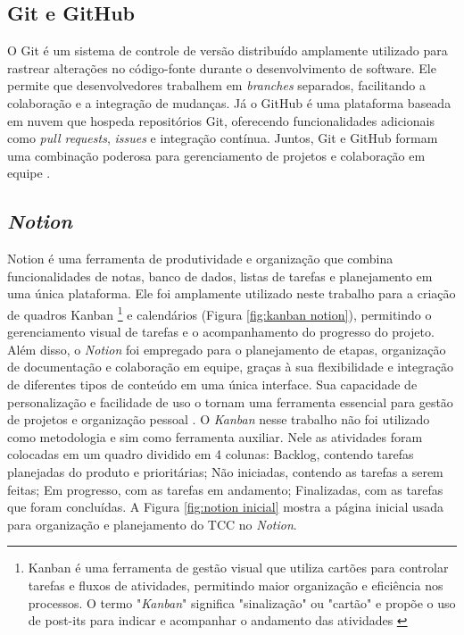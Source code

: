 {\subsection{Git e GitHub}
O Git é um sistema de controle de versão distribuído amplamente utilizado para rastrear alterações no código-fonte durante o desenvolvimento de software. Ele permite que desenvolvedores trabalhem em \textit{branches} separados, facilitando a colaboração e a integração de mudanças. Já o GitHub é uma plataforma baseada em nuvem que hospeda repositórios Git, oferecendo funcionalidades adicionais como \textit{pull requests}, \textit{issues} e integração contínua. Juntos, Git e GitHub formam uma combinação poderosa para gerenciamento de projetos e colaboração em equipe \citep{git,github}.

\subsection{\textit{Notion}}
 Notion é uma ferramenta de produtividade e organização que combina funcionalidades de notas, banco de dados, listas de tarefas e planejamento em uma única plataforma. Ele foi amplamente utilizado neste trabalho para a criação de quadros Kanban \footnote{Kanban é uma ferramenta de gestão visual que utiliza cartões para controlar tarefas e fluxos de atividades, permitindo maior organização e eficiência nos processos. O termo "\textit{Kanban}" significa "sinalização" ou "cartão" e propõe o uso de post-its para indicar e acompanhar o andamento das atividades \citep{aguiar2007compreendendo}} e calendários (Figura \ref{fig:kanban notion}), permitindo o gerenciamento visual de tarefas e o acompanhamento do progresso do projeto. Além disso, o \textit{Notion} foi empregado para o planejamento de etapas, organização de documentação e colaboração em equipe, graças à sua flexibilidade e integração de diferentes tipos de conteúdo em uma única interface. Sua capacidade de personalização e facilidade de uso o tornam uma ferramenta essencial para gestão de projetos e organização pessoal \citep{notion}.
 O \textit{Kanban} nesse trabalho não foi utilizado como metodologia e sim como ferramenta auxiliar. Nele as atividades foram colocadas em um quadro dividido em 4 colunas: Backlog, contendo tarefas planejadas do produto e prioritárias; Não iniciadas, contendo as tarefas a serem feitas; Em progresso, com as tarefas em andamento; Finalizadas, com as tarefas que foram concluídas.
 A Figura \ref{fig:notion inicial} mostra a página inicial usada para organização e planejamento do TCC no \textit{Notion}.

}
